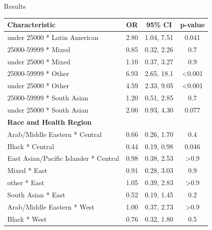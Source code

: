 \documentclass[
  ignorenonframetext,
]{beamer}
\begin{document}
\begin{frame}{Results}
\protect\hypertarget{results-1}{}
\tiny
\renewcommand{\arraystretch}{0.5}

\hypertarget{tbl-model1}{}
\begin{longtable}{lccc}
\toprule
\textbf{Characteristic} & \textbf{OR} & \textbf{95\% CI} & \textbf{p-value}\\
\midrule

\hspace{1em}under 25000 * Latin American & 2.80 & 1.04, 7.51 & 0.041\\
\hspace{1em}25000-59999 * Mixed & 0.85 & 0.32, 2.26 & 0.7\\
\hspace{1em}under 25000 * Mixed & 1.10 & 0.37, 3.27 & 0.9\\
\hspace{1em}25000-59999 * Other & 6.93 & 2.65, 18.1 & <0.001\\
\hspace{1em}under 25000 * Other & 4.59 & 2.33, 9.05 & <0.001\\
\hspace{1em}25000-59999 * South Asian & 1.20 & 0.51, 2.85 & 0.7\\
\hspace{1em}under 25000 * South Asian & 2.00 & 0.93, 4.30 & 0.077\\
\textbf{Race and Health Region} &  &  & \\
\hspace{1em}Arab/Middle Eastern * Central & 0.66 & 0.26, 1.70 & 0.4\\
\hspace{1em}Black * Central & 0.44 & 0.19, 0.98 & 0.046\\
\hspace{1em}East Asian/Pacific Islander * Central & 0.98 & 0.38, 2.53 & >0.9\\
\hspace{1em}Mixed * East & 0.91 & 0.28, 3.03 & 0.9\\
\hspace{1em}other * East & 1.05 & 0.39, 2.83 & >0.9\\
\hspace{1em}South Asian * East & 0.52 & 0.19, 1.45 & 0.2\\
\hspace{1em}Arab/Middle Eastern * West & 1.00 & 0.37, 2.73 & >0.9\\
\hspace{1em}Black * West & 0.76 & 0.32, 1.80 & 0.5\\

\end{longtable}
\end{frame}
\end{document}
